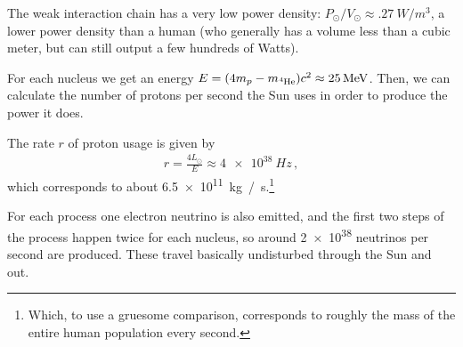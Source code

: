 \documentclass[main.tex]{subfiles}
\begin{document}






The weak interaction chain has a very low power density: \(P_{\odot} / V _{\odot} \approx \SI{.27}{W / m^3}\), a lower power density than a human (who generally has a volume less than a cubic meter, but can still output a few hundreds of Watts).

For each  nucleus we get an energy \(E = (4 m_p - m_{\ce{^{4}He}}) c^2 \approx\SI{25}{MeV}\).
Then, we can calculate the number of protons per second the Sun uses in order to produce the power it does. 

The rate \(r\) of proton usage is given by
%
\begin{align}
r = \frac{4 L_{\odot}}{E} 
 \approx \SI{4e38}{Hz}
\,,
\end{align}
%
which corresponds to about \SI{6.5e11}{kg /s}.\footnote{Which, to use a gruesome comparison, corresponds to roughly the mass of the entire human population every second.}

For each process one electron neutrino is also emitted, and the first two steps of the process happen twice for each  nucleus, so around \num{2e38} neutrinos per second are produced. 
These travel basically undisturbed through the Sun and out.
\end{document}
